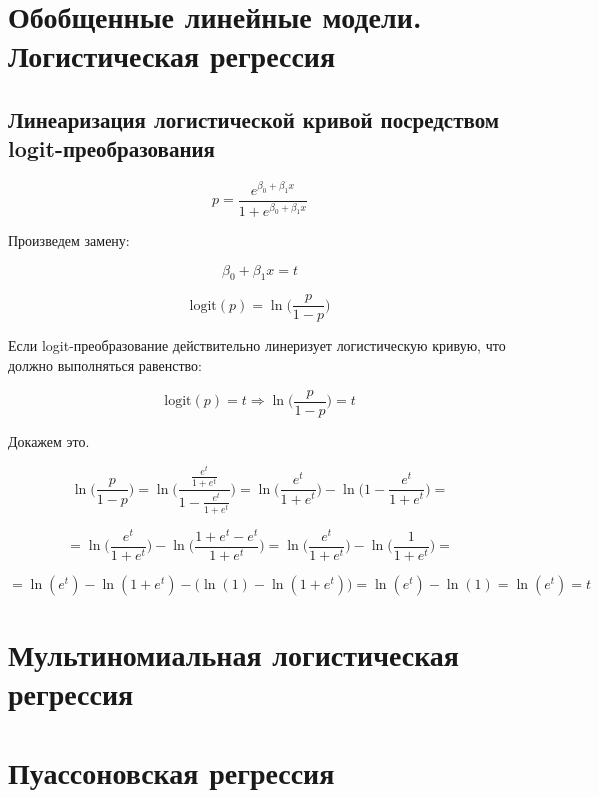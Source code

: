 \documentclass[
  letterpaper,
]{scrbook}
\theoremstyle{definition}
\theoremstyle{remark}
\begin{document}
\chapter{Обобщенные линейные модели. Логистическая
регрессия}\label{andan-logreg}

\section{Линеаризация логистической кривой посредством
logit-преобразования}\label{ux43bux438ux43dux435ux430ux440ux438ux437ux430ux446ux438ux44f-ux43bux43eux433ux438ux441ux442ux438ux447ux435ux441ux43aux43eux439-ux43aux440ux438ux432ux43eux439-ux43fux43eux441ux440ux435ux434ux441ux442ux432ux43eux43c-logit-ux43fux440ux435ux43eux431ux440ux430ux437ux43eux432ux430ux43dux438ux44f}

\[
p = \frac{e^{\beta_0 + \beta_1 x}}{1 + e^{\beta_0 + \beta_1 x}}
\]

Произведем замену:

\[
\beta_0 + \beta_1 x = t
\]

\[
\mathrm{logit}(p) = \ln \Big( \frac{p}{1-p} \Big)
\]

Если logit-преобразование действительно линеризует логистическую кривую,
что должно выполняться равенство:

\[
\mathrm{logit}(p) = t \Rightarrow \ln \Big( \frac{p}{1-p} \Big) = t
\]

Докажем это.

\[
\ln \Big( \frac{p}{1-p} \Big) = 
\ln \Bigg( \frac{\frac{e^t}{1 + e^t}}{1 - \frac{e^t}{1 + e^t}} \Bigg) =
\ln \Big( \frac{e^t}{1 + e^t} \Big) - \ln \Big(1 - \frac{e^t}{1 + e^t} \Big) = 
\]

\[
= \ln \Big( \frac{e^t}{1 + e^t} \Big) - \ln \Big(\frac{1 + e^t - e^t}{1 + e^t} \Big) = 
\ln \Big( \frac{e^t}{1 + e^t} \Big) - \ln \Big( \frac{1}{1 + e^t} \Big) = 
\]

\[
= \ln (e^t) - \ln (1 + e^t) - \big(\ln (1) - \ln (1+e^t)\big) = 
\ln (e^t) - \ln (1) = 
\ln (e^t) = t
\]


\chapter{Мультиномиальная логистическая
регрессия}\label{andan-multinomlogreg}


\chapter{Пуассоновская регрессия}\label{andan-poissonreg}
\end{document}
